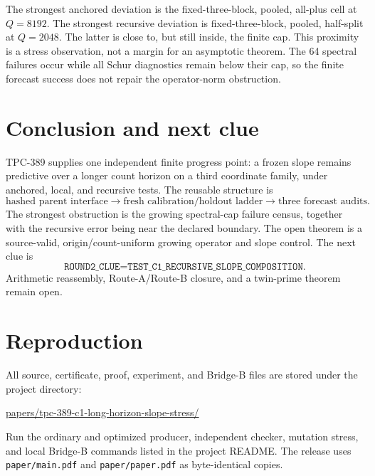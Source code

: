 \documentclass[10pt]{article}
\begin{document}
The strongest anchored deviation is the fixed-three-block, pooled, all-plus
cell at $Q=8192$.  The strongest recursive deviation is fixed-three-block,
pooled, half-split at $Q=2048$.  The latter is close to, but still inside,
the finite cap.  This proximity is a stress observation, not a margin for an
asymptotic theorem.  The 64 spectral failures occur while all Schur diagnostics
remain below their cap, so the finite forecast success does not repair the
operator-norm obstruction.

\section{Conclusion and next clue}

TPC-389 supplies one independent finite progress point: a frozen slope remains
predictive over a longer count horizon on a third coordinate family, under
anchored, local, and recursive tests.  The reusable structure is
\[
 \text{hashed parent interface}\longrightarrow
 \text{fresh calibration/holdout ladder}\longrightarrow
 \text{three forecast audits}.
\]
The strongest obstruction is the growing spectral-cap failure census, together
with the recursive error being near the declared boundary.  The open theorem
is a source-valid, origin/count-uniform growing operator and slope control.
The next clue is
\[
 \texttt{ROUND2\_CLUE=TEST\_C1\_RECURSIVE\_SLOPE\_COMPOSITION}.
\]
Arithmetic reassembly, Route-A/Route-B closure, and a twin-prime theorem remain
open.

\section*{Reproduction}

All source, certificate, proof, experiment, and Bridge-B files are stored under
the project directory:

\url{papers/tpc-389-c1-long-horizon-slope-stress/}

Run the ordinary and optimized producer, independent checker, mutation stress,
and local Bridge-B commands listed in the project README.  The release uses
\texttt{paper/main.pdf} and \texttt{paper/paper.pdf} as byte-identical copies.
\end{document}
